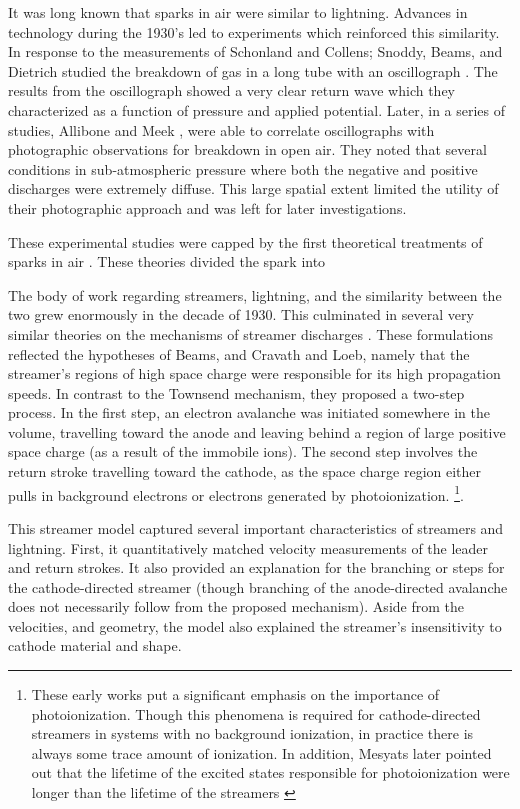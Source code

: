 It was long known that sparks in air were similar to lightning. Advances in
technology during the 1930's led to experiments which reinforced this
similarity. In response to the measurements of Schonland and Collens; Snoddy,
Beams, and Dietrich studied the breakdown of gas in a long tube with an
oscillograph \cite{Snoddy1936}. The results from the oscillograph showed a very
clear return wave which they characterized as a function of pressure and applied
potential. Later, in a series of studies, Allibone and Meek \cite{Allibone1938,
Allibone1938b, Allibone1938c}, were able to correlate oscillographs with
photographic observations for breakdown in open air. They noted that several
conditions in sub-atmospheric pressure where both the negative and positive
discharges were extremely diffuse. This large spatial extent limited the utility
of their photographic approach and was left for later investigations.

These experimental studies were capped by the first theoretical treatments of
sparks in air \cite{Flegler1936, Loeb1940, Loeb1940a, Meek1940}. These theories
divided the spark into 

The body of work regarding streamers, lightning, and the similarity between the
two grew enormously in the decade of 1930. This culminated in several very
similar theories on the mechanisms of streamer discharges \cite{Flegler1936,
Loeb1940, Loeb1940a, Meek1940}. These formulations reflected the hypotheses of
Beams, and Cravath and Loeb, namely that the streamer's regions of high space
charge were responsible for its high propagation speeds. In contrast to the
Townsend mechanism, they proposed a two-step process. In the first step, an
electron avalanche was initiated somewhere in the volume, travelling toward the
anode and leaving behind a region of large positive space charge (as a result of
the immobile ions). The second step involves the return stroke travelling toward
the cathode, as the space charge region either pulls in background electrons or
electrons generated by photoionization. \footnote{These early works put a
significant emphasis on the importance of photoionization. Though this phenomena
is required for cathode-directed streamers in systems with no background
ionization, in practice there is always some trace amount of ionization. In
addition, Mesyats later pointed out that the lifetime of the excited states
responsible for photoionization were longer than the lifetime of the streamers
\cite{Mesyats1972}}.

This streamer model captured several important characteristics of streamers and
lightning. First, it quantitatively matched velocity measurements of the leader
and return strokes. It also provided an explanation for the branching or steps
for the cathode-directed streamer (though branching of the anode-directed
avalanche does not necessarily follow from the proposed mechanism). Aside from
the velocities, and geometry, the model also explained the streamer's
insensitivity to cathode material and shape.


